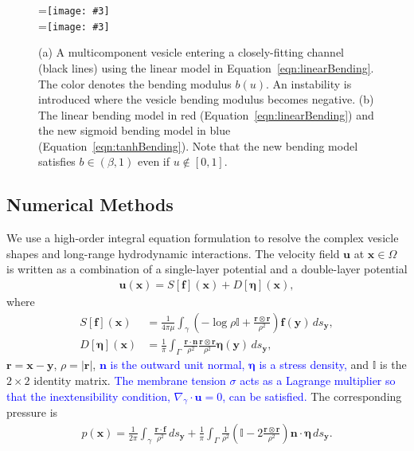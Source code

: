 \documentclass[twoside,twocolumn,9pt]{article}
\newcommand{\ff}{\mathbf{f}}
\newcommand{\eeta}{\boldsymbol{\eta}}
\newcommand{\nn}{\mathbf{n}}
\newcommand{\rr}{\mathbf{r}}
\newcommand{\uu}{\mathbf{u}}
\newcommand{\xx}{\mathbf{x}}
\newcommand{\yy}{\mathbf{y}}
\newcommand{\subfigimg}[3][,]{%
  \setbox1=\hbox{\texttt{[image: \#3]}}%
  \leavevmode\rlap{\usebox1}%
  \rlap{\hspace*{0pt}\raisebox{\dimexpr\ht1-0\baselineskip}{\bf
  \normalsize #2}}%
  \phantom{\usebox1}%
}
\begin{document}
\begin{figure}[h]
  \centering
  \subfigimg[width=0.9\linewidth, clip ]{(a)}{figures/OldBending.pdf} \\
  \subfigimg[width=0.9\linewidth, clip ]{(b)}{figures/concModels.pdf}
  \caption{\label{fig:concModels} \small (a) A multicomponent vesicle
  entering a closely-fitting channel (black lines) using the linear
  model in Equation~\eqref{eqn:linearBending}.  The color denotes the
  bending modulus $b(u)$.  An instability is introduced where the
  vesicle bending modulus becomes negative. (b) The linear bending model
  in red (Equation~\eqref{eqn:linearBending}) and the new sigmoid
  bending model in blue (Equation~\eqref{eqn:tanhBending}). Note that
  the new bending model satisfies $b \in (\beta,1)$ even if $u \notin
  [0,1]$.}
\end{figure}


\subsection{\label{sec:NumericalMethods}Numerical Methods}
We use a high-order integral equation formulation to resolve the complex
vesicle shapes and long-range hydrodynamic interactions. The velocity
field $\uu$ at $\xx \in \Omega$ is written as a combination of a
single-layer potential and a double-layer potential
\begin{align}
  \label{eqn:LPrep}
  \uu(\xx) = S[\ff](\xx) + D[\eeta](\xx),
\end{align}
where
\begin{align}
  S[\ff](\xx) &= \frac{1}{4\pi\mu} \int_{\gamma} \left(
    -\log \rho \mathds{I} + \frac{\rr \otimes \rr}{\rho^2} \right)
    \ff(\yy) \, ds_\yy, \\
%
    D[\eeta](\xx) &= \frac{1}{\pi} \int_{\Gamma} 
      \frac{\rr \cdot \nn}{\rho^2} 
      \frac{\rr \otimes \rr}{\rho^2} \eeta(\yy) \, ds_\yy,
\end{align}
$\rr = \xx - \yy$, $\rho = |\rr|$,
\textcolor{blue}{
$\nn$ is the outward unit normal, $\eeta$ is a stress density,}
and $\mathds{I}$ is the $2 \times 2$ identity matrix. 
\textcolor{blue}{
The membrane tension $\sigma$ acts as a Lagrange multiplier so that the
inextensibility condition, $\nabla_{\gamma} \cdot \uu = 0$, can be
satisfied.}
The corresponding pressure is
\begin{align}
  \label{eqn:pressure}
  p(\xx) = \frac{1}{2\pi} \int_{\gamma} \frac{\rr \cdot \ff}{\rho^2} \, ds_\yy + 
    \frac{1}{\pi} \int_{\Gamma} \frac{1}{\rho^2} 
    \left(\mathds{I} - 2\frac{\rr \otimes \rr}{\rho^2} \right) 
    \nn \cdot \eeta \, ds_\yy.
\end{align}
\end{document}
